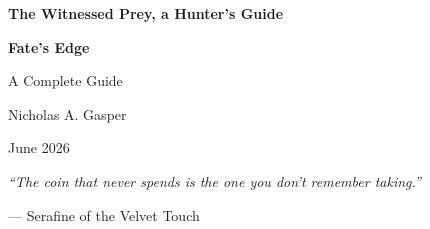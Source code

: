 \begin{titlepage}
\centering
\vspace*{1cm}

{\Huge\bfseries The Witnessed Prey, a Hunter's Guide\par}
\vspace{0.3cm}
{\Large\bfseries Fate's Edge\par}
\vspace{0.5cm}
{\large A Complete Guide\par}
\vspace{2cm}

{\large Nicholas A. Gasper\par}
\vspace{0.3cm}
{\large June 2026\par}

\vfill
{\large \textit{``The coin that never spends is the one you don't remember taking.''}\par}
\vspace{0.2cm}
{\large --- Serafine of the Velvet Touch\par}

\end{titlepage}
